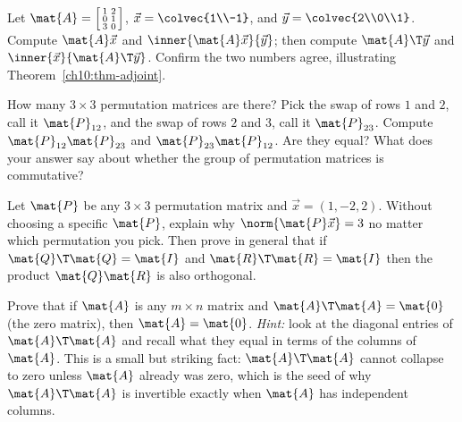 \begin{exercise}\label{ch10:ex-adjoint}
Let $\mat{A}=\left[\begin{smallmatrix}1&2\\0&1\\3&0\end{smallmatrix}\right]$,
$\vec{x}=\colvec{1\\-1}$, and $\vec{y}=\colvec{2\\0\\1}$. Compute $\mat{A}\vec{x}$ and
$\inner{\mat{A}\vec{x}}{\vec{y}}$; then compute $\mat{A}\T\vec{y}$ and $\inner{\vec{x}}{\mat{A}\T\vec{y}}$.
Confirm the two numbers agree, illustrating Theorem~\ref{ch10:thm-adjoint}.
\end{exercise}

\begin{exercise}\label{ch10:ex-count}
How many $3\times 3$ permutation matrices are there? Pick the swap of rows $1$ and $2$, call it
$\mat{P}_{12}$, and the swap of rows $2$ and $3$, call it $\mat{P}_{23}$. Compute $\mat{P}_{12}\mat{P}_{23}$
and $\mat{P}_{23}\mat{P}_{12}$. Are they equal? What does your answer say about whether the group of
permutation matrices is commutative?
\end{exercise}

\begin{exercise}\label{ch10:ex-isometry}
Let $\mat{P}$ be any $3\times 3$ permutation matrix and $\vec{x}=(1,-2,2)$. Without choosing a
specific $\mat{P}$, explain why $\norm{\mat{P}\vec{x}}=3$ no matter which permutation you pick. Then
prove in general that if $\mat{Q}\T\mat{Q}=\mat{I}$ and $\mat{R}\T\mat{R}=\mat{I}$ then the product
$\mat{Q}\mat{R}$ is also orthogonal.
\end{exercise}

\begin{exercise}\label{ch10:ex-proof}
Prove that if $\mat{A}$ is any $m\times n$ matrix and $\mat{A}\T\mat{A}=\mat{0}$ (the zero matrix),
then $\mat{A}=\mat{0}$. \emph{Hint:} look at the diagonal entries of $\mat{A}\T\mat{A}$ and recall
what they equal in terms of the columns of $\mat{A}$. This is a small but striking fact: $\mat{A}\T\mat{A}$
cannot collapse to zero unless $\mat{A}$ already was zero, which is the seed of why
$\mat{A}\T\mat{A}$ is invertible exactly when $\mat{A}$ has independent columns.
\end{exercise}
